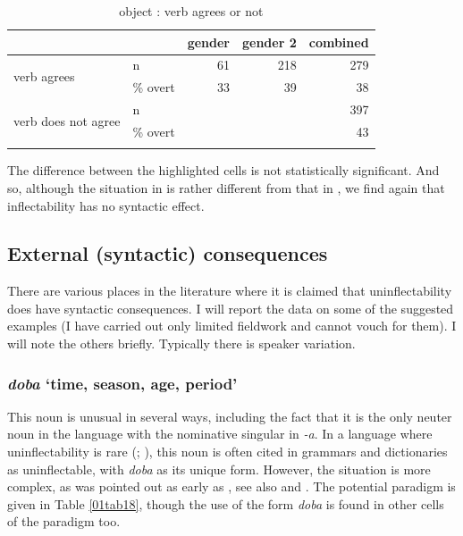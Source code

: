 \documentclass[output=paper,colorlinks,citecolor=brown]{langscibook}
\begin{document}
\begin{table}[ht]
	\centering
	\caption{ object : verb agrees or not \citep[300]{fedden2022}}
	\label{01tab17}
	\begin{tabularx}{0.85\textwidth}{llrrr}
		\lsptoprule
		& & gender & gender 2 & combined \\
		\midrule
		\multirow{2}{*}{verb agrees} & n & 61 & 218 & 279 \\
		& \% overt & 33 & 39 & \cellcolor{gray!25}38 \\
		\midrule
		\multirow{2}{*}{verb does not agree} & n & & & 397 \\
		& \% overt & & & \cellcolor{gray!25}43 \\			
		\lspbottomrule
	\end{tabularx}
\end{table}

The difference between the highlighted cells is not statistically significant. And so, although the situation in  is rather different from that in , we find again that inflectability has no syntactic effect.

\subsection{External (syntactic) consequences} \label{01sec6.2}

There are various places in the literature where it is claimed that uninflectability does have syntactic consequences. I will report the data on some of the suggested examples (I have carried out only limited fieldwork and cannot vouch for them). I will note the others briefly. Typically there is speaker variation.

\subsubsection{ \textit{doba} `time, season, age, period'} \label{01sec6.2.1}

This noun is unusual in several ways, including the fact that it is the only neuter noun in the language with the nominative singular in \textit{-a}. In a language where uninflectability is rare (\citealt[378]{browne1993-serbocroat}; \citealt{browne1993-nps}), this noun is often cited in grammars and dictionaries as uninflectable, with \textit{doba} as its unique form. However, the situation is more complex, as was pointed out as early as \citet[246]{kovacevic1951}, see also \citet[212--214]{stevanovic1975} and \citet[16--17]{nikolic1995-96}. The potential paradigm is given in Table \ref{01tab18}, though the use of the form \textit{doba} is found in other cells of the paradigm too.
\end{document}
